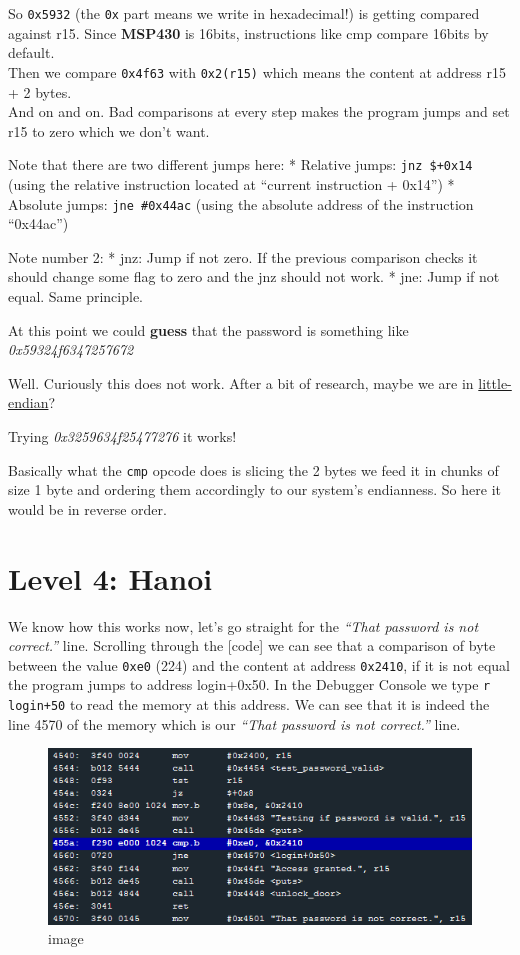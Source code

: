 \documentclass[a4paper,11pt]{article}
\begin{document}
So \texttt{0x5932} (the \texttt{0x} part means we write in hexadecimal!)
is getting compared against r15. Since \textbf{MSP430} is 16bits,
instructions like cmp compare 16bits by default.\\Then we compare
\texttt{0x4f63} with \texttt{0x2(r15)} which means the content at
address r15 + 2 bytes.\\And on and on. Bad comparisons at every step
makes the program jumps and set r15 to zero which we don't want.

Note that there are two different jumps here: * Relative jumps:
\texttt{jnz \$+0x14} (using the relative instruction located at
``current instruction + 0x14'') * Absolute jumps: \texttt{jne \#0x44ac}
(using the absolute address of the instruction ``0x44ac'')

Note number 2: * jnz: Jump if not zero. If the previous comparison
checks it should change some flag to zero and the jnz should not work. *
jne: Jump if not equal. Same principle.

At this point we could \textbf{guess} that the password is something
like \emph{0x59324f6347257672}

Well. Curiously this does not work. After a bit of research, maybe we
are in \href{http://en.wikipedia.org/wiki/Endianness}{little-endian}?

Trying \emph{0x3259634f25477276} it works!

Basically what the \texttt{cmp} opcode does is slicing the 2 bytes we
feed it in chunks of size 1 byte and ordering them accordingly to our
system's endianness. So here it would be in reverse order.

\section{Level 4: Hanoi}\label{level-4-hanoi}

We know how this works now, let's go straight for the \emph{``That
password is not correct.''} line. Scrolling through the {[}code{]} we
can see that a comparison of byte between the value \texttt{0xe0} (224)
and the content at address \texttt{0x2410}, if it is not equal the
program jumps to address login+0x50. In the Debugger Console we type
\texttt{r login+50} to read the memory at this address. We can see that
it is indeed the line 4570 of the memory which is our \emph{``That
password is not correct.''} line.

\begin{figure}[htbp]
\centering
\includegraphics{img/3_1.PNG}
\caption{image}
\end{figure}
\end{document}
